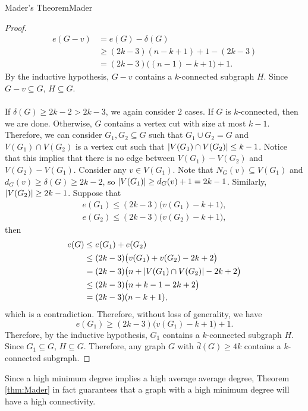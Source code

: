 \documentclass[math, code]{amznotes}
\theoremstyle{remark}
\begin{document}
\begin{thmbox}{Mader's Theorem}{Mader}
\begin{proof}
        \begin{align*}
            e(G - v) & = e(G) - \delta(G) \\
            & \geq (2k - 3)(n - k + 1) + 1 - (2k - 3) \\
            & = (2k - 3)\bigl((n - 1) - k + 1\bigr) + 1.
        \end{align*}
        By the inductive hypothesis, $G - v$ contains a $k$-connected subgraph $H$. Since $G - v \subseteq G$, $H \subseteq G$.
        \\\\
        If $\delta(G) \geq 2k - 2 > 2k - 3$, we again consider $2$ cases. If $G$ is $k$-connected, then we are done. Otherwise, $G$ contains a vertex cut with size at most $k - 1$. Therefore, we can consider $G_1, G_2 \subseteq G$ such that $G_1 \cup G_2 = G$ and $V(G_1) \cap V(G_2)$ is a vertex cut such that ${\left\lvert {V(G_1) \cap V(G_2)} \right\rvert} \leq k - 1$. Notice that this implies that there is no edge between $V(G_1) - V(G_2)$ and $V(G_2) - V(G_1)$. Consider any $v \in V(G_1)$. Note that $N_G(v) \subseteq V(G_1)$ and $d_G(v) \geq \delta(G) \geq 2k - 2$, so ${\left\lvert {V(G_1)} \right\rvert} \geq d_G(v) + 1 = 2k - 1$. Similarly, ${\left\lvert {V(G_2)} \right\rvert} \geq 2k - 1$. Suppose that 
        \begin{align*}
            e(G_1) \leq (2k - 3)\bigl(v(G_1) - k + 1\bigr), \\
            e(G_2) \leq (2k - 3)\bigl(v(G_2) - k + 1\bigr),
        \end{align*}
        then 
        \begin{align*}
            e(G) & \leq e(G_1) + e(G_2) \\
            & \leq (2k - 3)\bigl(v(G_1) + v(G_2) - 2k + 2\bigr) \\
            & = (2k - 3)\bigl(n + {\left\lvert {V(G_1) \cap V(G_2)} \right\rvert} - 2k + 2\bigr) \\
            & \leq (2k - 3)\bigl(n + k - 1 - 2k + 2\bigr) \\
            & = (2k - 3)(n - k + 1),
        \end{align*}
        which is a contradiction. Therefore, without loss of generality, we have 
        \begin{equation*}
            e(G_1) \geq (2k - 3)\bigl(v(G_1) - k + 1\bigr) + 1.
        \end{equation*}
        Therefore, by the inductive hypothesis, $G_1$ contains a $k$-connected subgraph $H$. Since $G_1 \subseteq G$, $H \subseteq G$. Therefore, any graph $G$ with $\bar{d}(G) \geq 4k$ contains a $k$-connected subgraph.
    \end{proof}
\end{thmbox}
Since a high minimum degree implies a high average average degree, Theorem \ref{thm:Mader} in fact guarantees that a graph with a high minimum degree will have a high connectivity.
\end{document}
